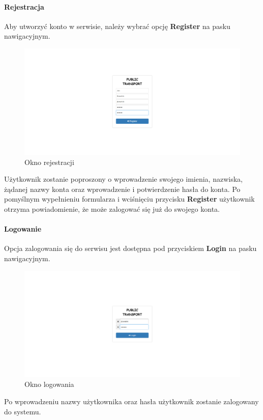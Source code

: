 \documentclass[10pt,a4paper]{article}
\begin{document}
\paragraph{Rejestracja}
Aby utworzyć konto w serwisie, należy wybrać opcję \textbf{Register} na pasku nawigacyjnym.
\begin{figure}[H]
	\centering
	\includegraphics[width=15cm]{Resources/Images/30_registration.png}
	\caption{Okno rejestracji}
\end{figure}
Użytkownik zostanie poproszony o wprowadzenie swojego imienia, nazwiska, żądanej nazwy konta oraz wprowadzenie i potwierdzenie hasła do konta. Po pomyślnym wypełnieniu formularza i wciśnięciu przycisku \textbf{Register} użytkownik otrzyma powiadomienie, że może zalogować się już do swojego konta.

\paragraph{Logowanie}
Opcja zalogowania się do serwisu jest dostępna pod przyciskiem \textbf{Login} na pasku nawigacyjnym.
\begin{figure}[H]
	\centering
	\includegraphics[width=15cm]{Resources/Images/31_login.png}
	\caption{Okno logowania}
\end{figure}
Po wprowadzeniu nazwy użytkownika oraz hasła użytkownik zostanie zalogowany do systemu.
\end{document}
